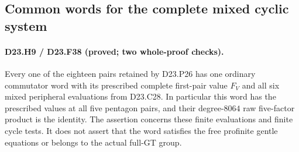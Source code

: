 \subsection{Common words for the complete mixed cyclic system}

\paragraph{D23.H9 / D23.F38 (proved; two whole-proof checks).}
Every one of the eighteen pairs retained by D23.P26 has
one ordinary commutator word with its prescribed complete
first-pair value $F_V$ and all six mixed peripheral
evaluations from D23.C28. In particular this word has
the prescribed values at all five pentagon pairs, and
their degree-$8064$ raw five-factor product is the identity.
The assertion concerns these finite evaluations and
finite cycle tests. It does not assert that the word
satisfies the free profinite gentle equations or belongs
to the actual full-GT group.

